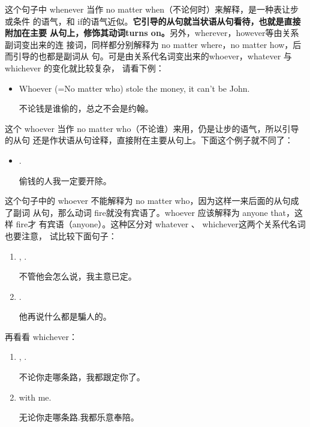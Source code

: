 这个句子中 whenever 当作 no matter when（不论何时）来解释，是一种表让步或条件
的语气，和 if的语气近似。\textbf{它引导的从句就当状语从句看待，也就是直接附加在主要
  从句上，修饰其动词turns on。}另外，wherever，however等由关系副词变出来的连
接词，同样都分别解释为 no matter where，no matter how，后而引导的也都是副词从
句。可是由关系代名词变出来的whoever，whatever 与 whichever 的变化就比较复杂，
请看下例：
\begin{itemize}
\item Whoever (=No matter who) stole the money, it can't be John.

  不论钱是谁偷的，总之不会是约翰。
\end{itemize}
这个 whoever 当作 no matter who（不论谁）来用，仍是让步的语气，所以引导的从句
还是作状语从句诠释，直接附在主要从句上。下面这个例子就不同了：
\begin{itemize}
\item {} .

  偷钱的人我一定要开除。
\end{itemize}
这个句子中的 whoever 不能解释为 no matter who，因为这样一来后面的从句成了副词
从句，那么动词 fire就没有宾语了。whoever 应该解释为 anyone that，这样 fire才
有宾语（anyone）。这种区分对 whatever 、 whichever这两个关系代名词也要注意，
试比较下面句子：
\begin{enumerate}
\item {},   .

  不管他会怎么说，我主意已定。
\item {}  .

  他再说什么都是騙人的。
\end{enumerate}

再看看 whichever：
\begin{enumerate}
\item {},
  .

  不论你走哪条路，我都跟定你了。
\item {}   with me.

  无论你走哪条路.我都乐意奉陪。
\end{enumerate}

